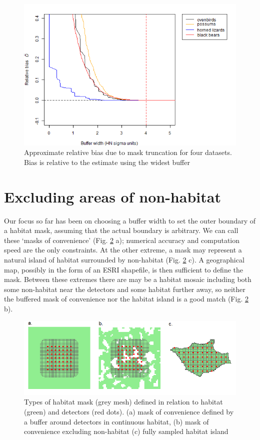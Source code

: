 \documentclass[
]{book}
\begin{document}
\begin{figure}
\includegraphics[width=0.75\linewidth]{figures/maskesa} \caption{Approximate relative bias due to mask truncation for four datasets. Bias is relative to the estimate using the widest buffer}\label{fig:bufferbias}
\end{figure}

\section{Excluding areas of non-habitat}\label{excluding-areas-of-non-habitat}

Our focus so far has been on choosing a buffer width to set the outer boundary of a habitat mask, assuming that the actual boundary is arbitrary. We can call these `masks of convenience' (Fig. \ref{fig:masktypes} a); numerical accuracy and computation speed are the only constraints. At the other extreme, a mask may represent a natural island of habitat surrounded by non-habitat (Fig. \ref{fig:masktypes} c). A geographical map, possibly in the form of an ESRI shapefile, is then sufficient to define the mask. Between these extremes there are may be a habitat mosaic including both some non-habitat near the detectors and some habitat further away, so neither the buffered mask of convenience nor the habitat island is a good match (Fig. \ref{fig:masktypes} b).

\begin{figure}
\includegraphics[width=1\linewidth]{figures/masktypes} \caption{Types of habitat mask (grey mesh) defined in relation to habitat (green) and detectors (red dots). (a) mask of convenience defined by a buffer around detectors in continuous habitat, (b) mask of convenience excluding non-habitat (c) fully sampled habitat island}\label{fig:masktypes}
\end{figure}
\end{document}
